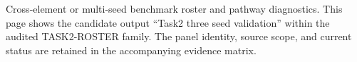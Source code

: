 Cross-element or multi-seed benchmark roster and pathway diagnostics. This page shows the candidate output ``Task2 three seed validation'' within the audited TASK2-ROSTER family. The panel identity, source scope, and current status are retained in the accompanying evidence matrix.
